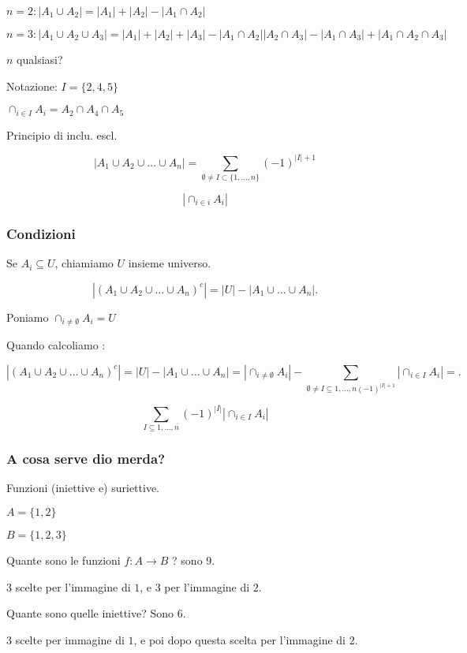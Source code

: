 \documentclass[11pt]{article}
\begin{document}
		$n=2 : |A_1 \cup A_2| = |A_1| + |A_2| - |A_1 \cap A_2|$

		$n=3 : |A_1 \cup A_2 \cup A_3| = |A_1| + |A_2| + |A_3| - |A_1 \cap A_2|
		|A_2 \cap A_3| - |A_1 \cap A_3| + |A_1 \cap A_2 \cap A_3|$
		
		$n$ qualsiasi?

		Notazione: $I = \{2,4,5\}$

		$\cap_{i \in I}A_i = A_2 \cap A_4 \cap A_5$

		Principio di inclu. escl.
		
		\[
		|A_1 \cup A_2 \cup \ldots \cup A_n| = 
		\sum_{\emptyset \neq I \subset \{1,\ldots,n\}} (-1)^{|I|+ 1}
		\] 
		
		\[
		|\cap_{i \in i} A_i|
		\]

		\subsubsection{Condizioni}

		Se $A_i \subseteq U$, chiamiamo $U$ insieme universo.
		
		\[
			|(A_1 \cup A_2 \cup \ldots \cup A_n)^{c}| = |U| - |A_1 \cup \ldots 
			\cup A_n|
		.\] 
		
		Poniamo $\cap_{i \neq \emptyset} A_i = U$

		Quando calcoliamo :

		\[
			|(A_1 \cup A_2 \cup \ldots \cup A_n)^{c}| = |U| - |A_1 \cup \ldots 
			\cup A_n|
			=
			|\cap_{i \neq \emptyset} A_i| - 
			\sum_{\emptyset \neq I \subseteq {1,\ldots,n} (-1)^{|I| + 1}}
			|\cap_{i \in I} A_i| =
		.\] 
			
		\[
			\sum_{I \subseteq {1,\ldots,n}} (-1)^{|I|}| \cap_{i \in I} A_i|
		\]

		\subsubsection{A cosa serve dio merda?}

		Funzioni (iniettive e) suriettive.

		$A = \{1,2\}$

		$B = \{1,2,3\}$

		Quante sono le funzioni  $f: A \to  B$ ? sono 9.

		$3$ scelte per l'immagine di $1$, e $3$ per l'immagine di $2$.

		Quante sono quelle iniettive? Sono 6.

		$3$ scelte per immagine di $1$, e poi dopo questa scelta per l'immagine
		di $2$.
\end{document}

